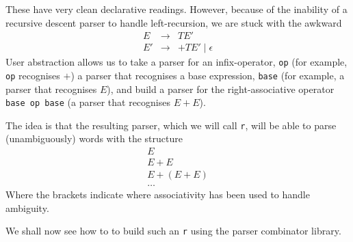 These have very clean declarative readings. However, because of the inability of a recursive descent parser to handle left-recursion, we are stuck with the awkward
\[\begin{array}{rcl}
     E & \to & T E'  \\
     E' & \to & + TE' \mid \epsilon 
\end{array}\]
User abstraction allows us to take a parser for an infix-operator, \texttt{op} (for example, \texttt{op} recognises $+$) a parser that recognises a base expression, \texttt{base} (for example, a parser that recognises $E$), and build a parser for the right-associative operator \texttt{base op base} (a parser that recognises $E + E$). 

The idea is that the resulting parser, which we will call \texttt{r}, will be able to parse (unambiguously) words with the structure
\[\begin{array}{l}
     E\\
     E+E\\
     E+(E+E)\\
     \ldots
\end{array}\]
Where the brackets indicate where associativity has been used to handle ambiguity.

We shall now see how to to build such an \texttt{r} using the parser combinator library.

